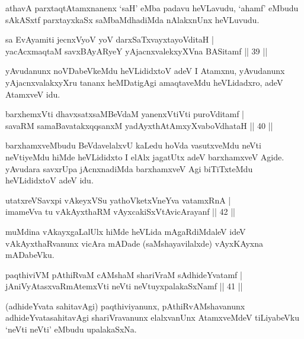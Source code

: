 \begin{artha}
athavA parxtaqtAtamxnanenx `saH' eMba padavu heVLavudu, `ahamf'
eMbudu sAkASxtf parxtayxkaSx saMbaMdhadiMda nAlakxnUnx heVLuvudu.
\end{artha}

\begin{shl}
sa EvAyamiti jecnxVyoV yoV darxSaTxvayxtayoVditaH |\\
yacAcxmaqtaM savxBAyARyeY yAjacnxvalekxyXVna BASitamf \hfill || 39 ||
\end{shl}

\begin{artha}
yAvudanunx noVDabeVkeMdu heVLididxtoV adeV I Atamxnu, yAvudanunx yAjacnxvalakxyXru tananx heMDatigAgi amaqtaveMdu heVLidadxro, adeV AtamxveV idu.
\end{artha}


\begin{shl}
barxhemxVti dhavxsatxsaMBeVdaM yanenxVtiVti puroVditamf |\\
savaRM samaBavatakxqqsanxM yadAyxthAtAmxyXvaboVdhataH \hfill || 40 ||
\end{shl}

\begin{artha}
barxhamxveMbudu BeVdavelalxvU kaLedu hoVda vasutxveMdu neVti neVtiyeMdu hiMde heVLididxto I elAlx jagatUtx adeV barxhamxveV Agide. yAvudara savxrUpa jAcnxnadiMda barxhamxveV Agi biTiTxteMdu heVLididxtoV adeV idu.
\end{artha}

\begin{shl}
utatxreVSavxpi vAkeyxVSu yathoVketxVneYva vatamxRnA |\\
imameVva tu vAkAyxthaRM vAyxcakiSxVtAvicArayanf \hfill || 42 ||
\end{shl}

\begin{artha}
muMdina vAkayxgaLalUlx hiMde heVLida mAgaRdiMdaleV ideV vAkAyxthaRvanunx vicAra mADade (saMshayavilalxde) vAyxKAyxna mADabeVku.
\end{artha}

\begin{shl}
paqthiviVM pAthiRvaM cAMshaM shariVraM sAdhideYvatamf |\\
jAniVyAtasxvaRmAtemxVti neVti neVtuyxpalakaSxNamf \hfill || 41 ||
\end{shl}

\begin{artha}
(adhideYvata sahitavAgi) paqthiviyanunx, pAthiRvAMshavanunx   adhideYvatasahitavAgi shariVravanunx elalxvanUnx AtamxveMdeV   tiLiyabeVku `neVti neVti' eMbudu upalakaSxNa.
\end{artha}

